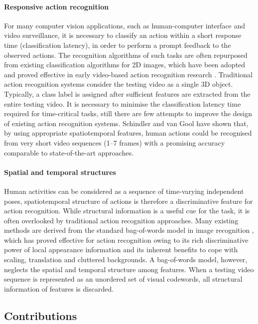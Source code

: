 \paragraph{Responsive action recognition}  For many computer vision applications, such as human-computer interface and video surveillance, it is necessary to classify an action within a short response time (classification latency), in order to perform a prompt feedback to the observed actions.  The recognition algorithms of such tasks are often repurposed from existing classification algorithms for 2D images, which have been adopted and proved effective in early video-based action recognition research \cite{Schuldt2004, Dollar2005}.  Traditional action recognition systems consider the testing video as a single 3D object. Typically, a class label is assigned after sufficient features are extracted from the entire testing video. It is necessary to minimise the classification latency time required for time-critical tasks, still there are few attempts to improve the design of existing action recognition systems. Schindler and van Gool \cite{Schindler2008} have shown that, by using appropriate spatiotemporal features, human actions could be recognised from very short video sequences (1--7 frames) with a promising accuracy comparable to state-of-the-art approaches.

\paragraph{Spatial and temporal structures}
Human activities can be considered as a sequence of time-varying independent poses, spatiotemporal structure of actions is therefore a discriminative feature for action recognition.  
While structural information is a useful cue for the task, it is often overlooked by traditional action recognition approaches.  
Many existing methods are derived from the standard bag-of-words model in image recognition \cite{Sivic2005, Fei-Fei2005}, which has proved effective for action recognition owing to its rich discriminative power of local appearance information and its inherent benefits to cope with scaling, translation and cluttered backgrounds. 
A bag-of-words model, however, neglects the spatial and temporal structure among features. 
When a testing video sequence is represented as an unordered set of visual codewords, all structural information of features is discarded. 

\subsection{Contributions}


